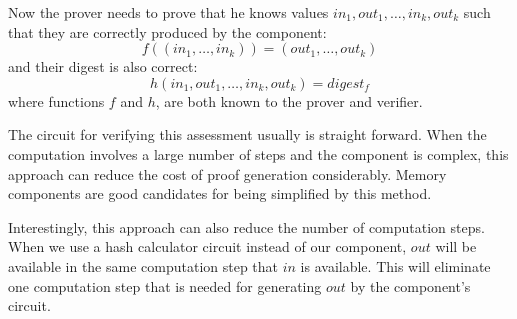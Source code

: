Now the prover needs to prove that he knows values $in_1,out_1,\dots,in_k,out_k$ such that they are correctly
produced by the component:
\[
    f((in_1,\dots,in_k)) = (out_1,\dots,out_k)
\]
and their digest is also correct:
\[
    h(in_1,out_1,\dots,in_k,out_k) = digest_f
\]
where functions $f$ and $h$, are both known to the prover and verifier.

The circuit for verifying this assessment usually is straight forward. When the computation involves a large
number of steps and the component is complex, this approach can reduce the cost of proof generation considerably. Memory
components are good candidates for being simplified by this method.

Interestingly, this approach can also reduce the number of computation steps. When we use a hash calculator circuit
instead of our component, $out$ will be available in the same computation step that $in$ is available. This will
eliminate one computation step that is needed for generating $out$ by the component's circuit.
%
